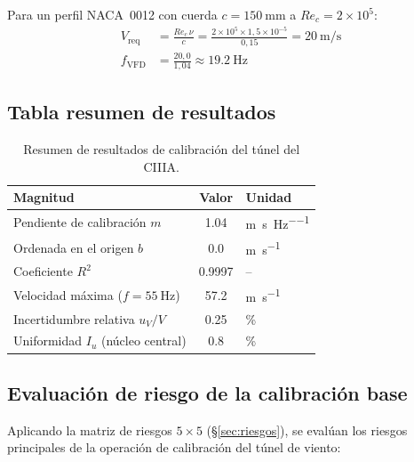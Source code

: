\documentclass[12pt,a4paper]{article}
\begin{document}
Para un perfil NACA~0012 con cuerda $c = \SI{150}{\mm}$ a $Re_c = 2\times10^5$:
\begin{align}
	V_\mathrm{req} & = \frac{Re_c\,\nu}{c}
	= \frac{2\times10^5 \times 1{,}5\times10^{-5}}{0{,}15}
	= \SI{20}{\metre\per\second}                                    \\
	f_\mathrm{VFD} & = \frac{20{,}0}{1{,}04} \approx \SI{19.2}{\Hz}
	\label{eq:Re_NACA0012}
\end{align}

\subsection{Tabla resumen de resultados}

\begin{table}[H]
	\centering
	\caption{Resumen de resultados de calibración del túnel del CIIIA.}
	\label{tab:resumen_cal}
	\begin{tabular}{lSl}
		\toprule
		\textbf{Magnitud}                   & {\textbf{Valor}} & \textbf{Unidad}      \\
		\midrule
		Pendiente de calibración $m$        & 1.04             & \si{\m\per\s\per\Hz} \\
		Ordenada en el origen $b$           & 0.0              & \si{\m\per\s}        \\
		Coeficiente $R^2$                   & 0.9997           & --                   \\
		Velocidad máxima ($f=\SI{55}{\Hz}$) & 57.2             & \si{\m\per\s}        \\
		Incertidumbre relativa $u_V/V$      & 0.25             & \si{\percent}        \\
		Uniformidad $I_u$ (núcleo central)  & 0.8              & \si{\percent}        \\
		\bottomrule
	\end{tabular}
\end{table}

\subsection{Evaluación de riesgo de la calibración base}
\label{sec:riesgo_base}

Aplicando la matriz de riesgos $5\times5$ (§\ref{sec:riesgos}), se evalúan los
riesgos principales de la operación de calibración del túnel de viento:
\end{document}
